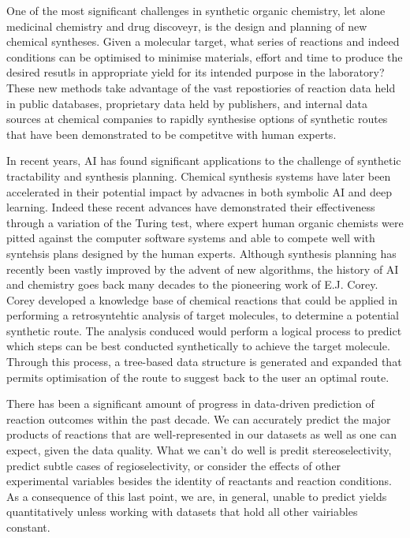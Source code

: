 One of the most significant challenges in synthetic organic chemistry, let alone medicinal chemistry and drug discoveyr, is the design and planning of new chemical syntheses. Given a molecular target, what series of reactions and indeed conditions can be optimised to minimise materials, effort and time to produce the desired resutls in appropriate yield for its intended purpose in the laboratory? These new methods take advantage of the vast repostiories of reaction data held in public databases, proprietary data held by publishers, and internal data sources at chemical companies to rapidly synthesise options of synthetic routes that have been demonstrated to be competitve with human experts. 

In recent years, AI has found significant applications to the challenge of synthetic tractability and synthesis planning. Chemical synthesis systems have later been accelerated in their potential impact by advacnes in both symbolic AI and deep learning. Indeed these recent advances have demonstrated their effectiveness through a variation of the Turing test, where expert human organic chemists were pitted against the computer software systems and able to compete well with syntehsis plans designed by the human experts. Although synthesis planning has recently been vastly improved by the advent of new algorithms, the history of AI and chemistry goes back many decades to the pioneering work of E.J. Corey. Corey developed a knowledge base of chemical reactions that could be applied in performing a retrosyntehtic analysis of target molecules, to determine a potential synthetic route. The analysis conduced would perform a logical process to predict which steps can be best conducted synthetically to achieve the target molecule. Through this process, a tree-based data structure is generated and expanded that permits optimisation of the route to suggest back to the user an optimal route.

There has been a significant amount of progress in data-driven prediction of reaction outcomes within the past decade. We can accurately predict the major products of reactions that are well-represented in our datasets as well as one can expect, given the data quality. What we can't do well is predit stereoselectivity, predict subtle cases of regioselectivity, or consider the effects of other experimental variables besides the identity of reactants and reaction conditions. As a consequence of this last point, we are, in general, unable to predict yields quantitatively unless working with datasets that hold all other vairiables constant. 

